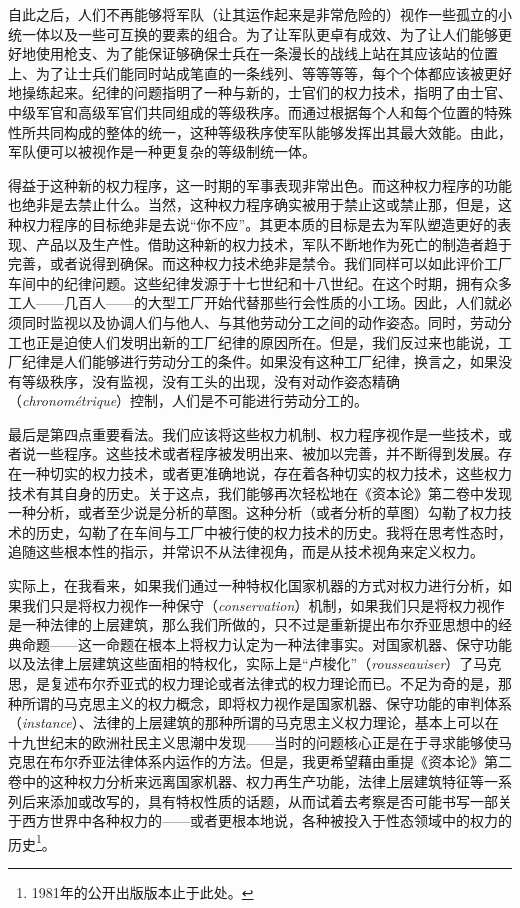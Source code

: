 \documentclass[fontset=fandol, a4paper, 12pt, twoside]{ctexart}
\newcommand{\fr}[1]{\textit{#1}}
\begin{document}
自此之后，人们不再能够将军队（让其运作起来是非常危险的）视作一些孤立的小统一体以及一些可互换的要素的组合。为了让军队更卓有成效、为了让人们能够更好地使用枪支、为了能保证够确保士兵在一条漫长的战线上站在其应该站的位置上、为了让士兵们能同时站成笔直的一条线列、等等等等，每个个体都应该被更好地操练起来。纪律的问题指明了一种与新的，士官们的权力技术，指明了由士官、中级军官和高级军官们共同组成的等级秩序。而通过根据每个人和每个位置的特殊性所共同构成的整体的统一，这种等级秩序使军队能够发挥出其最大效能。由此，军队便可以被视作是一种更复杂的等级制统一体。

得益于这种新的权力程序，这一时期的军事表现非常出色。而这种权力程序的功能也绝非是去禁止什么。当然，这种权力程序确实被用于禁止这或禁止那，但是，这种权力程序的目标绝非是去说“你不应”。其更本质的目标是去为军队塑造更好的表现、产品以及生产性。借助这种新的权力技术，军队不断地作为死亡的制造者趋于完善，或者说得到确保。而这种权力技术绝非是禁令。我们同样可以如此评价工厂车间中的纪律问题。这些纪律发源于十七世纪和十八世纪。在这个时期，拥有众多工人——几百人——的大型工厂开始代替那些行会性质的小工场。因此，人们就必须同时监视以及协调人们与他人、与其他劳动分工之间的动作姿态。同时，劳动分工也正是迫使人们发明出新的工厂纪律的原因所在。但是，我们反过来也能说，工厂纪律是人们能够进行劳动分工的条件。如果没有这种工厂纪律，换言之，如果没有等级秩序，没有监视，没有工头的出现，没有对动作姿态精确（\fr{chronométrique}）控制，人们是不可能进行劳动分工的。

最后是第四点重要看法。我们应该将这些权力机制、权力程序视作是一些技术，或者说一些程序。这些技术或者程序被发明出来、被加以完善，并不断得到发展。存在一种切实的权力技术，或者更准确地说，存在着各种切实的权力技术，这些权力技术有其自身的历史。关于这点，我们能够再次轻松地在《资本论》第二卷中发现一种分析，或者至少说是分析的草图。这种分析（或者分析的草图）勾勒了权力技术的历史，勾勒了在车间与工厂中被行使的权力技术的历史。我将在思考性态时，追随这些根本性的指示，并常识不从法律视角，而是从技术视角来定义权力。

实际上，在我看来，如果我们通过一种特权化国家机器的方式对权力进行分析，如果我们只是将权力视作一种保守（\fr{conservation}）机制，如果我们只是将权力视作是一种法律的上层建筑，那么我们所做的，只不过是重新提出布尔乔亚思想中的经典命题——这一命题在根本上将权力认定为一种法律事实。对国家机器、保守功能以及法律上层建筑这些面相的特权化，实际上是“卢梭化”（\fr{rousseauiser}）了马克思，是复述布尔乔亚式的权力理论或者法律式的权力理论而已。不足为奇的是，那种所谓的马克思主义的权力概念，即将权力视作是国家机器、保守功能的审判体系（\fr{instance}）、法律的上层建筑的那种所谓的马克思主义权力理论，基本上可以在十九世纪末的欧洲社民主义思潮中发现——当时的问题核心正是在于寻求能够使马克思在布尔乔亚法律体系内运作的方法。但是，我更希望藉由重提《资本论》第二卷中的这种权力分析来远离国家机器、权力再生产功能，法律上层建筑特征等一系列后来添加或改写的，具有特权性质的话题，从而试着去考察是否可能书写一部关于西方世界中各种权力的——或者更根本地说，各种被投入于性态领域中的权力的历史\footnote{1981年的公开出版版本止于此处。}。
\end{document}
